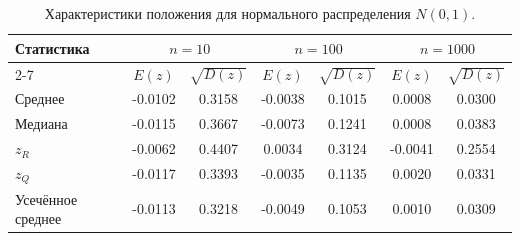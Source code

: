 \begin{table}[H]
\centering
\small
\begin{tabular}{|l|cc|cc|cc|}
\hline
\multirow{2}{*}{Статистика} & \multicolumn{2}{c|}{$n=10$} & \multicolumn{2}{c|}{$n=100$} & \multicolumn{2}{c|}{$n=1000$} \\
\cline{2-7}
 & $E(z)$ & $\sqrt{D(z)}$ & $E(z)$ & $\sqrt{D(z)}$ & $E(z)$ & $\sqrt{D(z)}$ \\
\hline
Среднее & -0.0102 & 0.3158 & -0.0038 & 0.1015 & 0.0008 & 0.0300 \\
\hline
Медиана & -0.0115 & 0.3667 & -0.0073 & 0.1241 & 0.0008 & 0.0383 \\
\hline
$z_R$ & -0.0062 & 0.4407 & 0.0034 & 0.3124 & -0.0041 & 0.2554 \\
\hline
$z_Q$ & -0.0117 & 0.3393 & -0.0035 & 0.1135 & 0.0020 & 0.0331 \\
\hline
Усечённое среднее & -0.0113 & 0.3218 & -0.0049 & 0.1053 & 0.0010 & 0.0309 \\
\hline
\end{tabular}
\caption{Характеристики положения для нормального распределения $N(0,1)$.}
\label{tab:normal_precise}
\end{table}